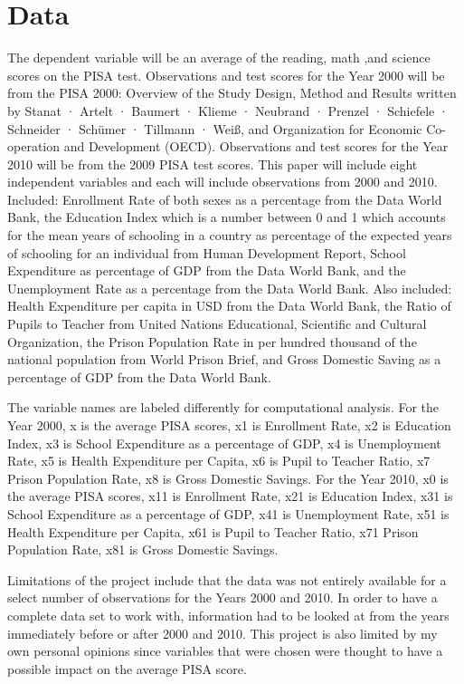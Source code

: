 \documentclass[12pt,english]{article}
\begin{document}
\section{Data}
The dependent variable will be an average of the reading, math ,and science scores on the PISA test. Observations and test scores for the Year 2000 will be from the PISA 2000: Overview of the Study Design, Method and Results written by Stanat · Artelt · Baumert · Klieme · Neubrand · Prenzel · Schiefele · Schneider · Schümer · Tillmann · Weiß, and Organization for Economic Co-operation and Development (OECD). Observations and test scores for the Year 2010 will be from the 2009 PISA test scores. This paper will include eight independent variables and each will include observations from 2000 and 2010. Included: Enrollment Rate of both sexes as a percentage from the Data World Bank, the Education Index which is a number between 0 and 1 which accounts for the mean years of schooling in a country as percentage of the expected years of schooling for an individual from Human Development Report, School Expenditure as percentage of GDP from the Data World Bank, and the Unemployment Rate as a percentage from the Data World Bank. Also included: Health Expenditure per capita in USD from the Data World Bank, the Ratio of Pupils to Teacher from United Nations Educational, Scientific and Cultural Organization, the Prison Population Rate in per hundred thousand of the national population from World Prison Brief, and Gross Domestic Saving as a percentage of GDP from the Data World Bank.

The variable names are labeled differently for computational analysis. For the Year 2000, x is the average PISA scores, x1 is Enrollment Rate, x2 is Education Index, x3 is School Expenditure as a percentage of GDP, x4 is Unemployment Rate, x5 is Health Expenditure per Capita, x6 is Pupil to Teacher Ratio, x7 Prison Population Rate, x8 is Gross Domestic Savings. For the Year 2010, x0 is the average PISA scores, x11 is Enrollment Rate, x21 is Education Index, x31 is School Expenditure as a percentage of GDP, x41 is Unemployment Rate, x51 is Health Expenditure per Capita, x61 is Pupil to Teacher Ratio, x71 Prison Population Rate, x81 is Gross Domestic Savings. 

Limitations of the project include that the data was not entirely available for a select number of observations for the Years 2000 and 2010. In order to have a complete data set to work with, information had to be looked at from the years immediately before or after 2000 and 2010. This project is also limited by my own personal opinions since variables that were chosen were thought to have a possible impact on the average PISA score.
\end{document}
